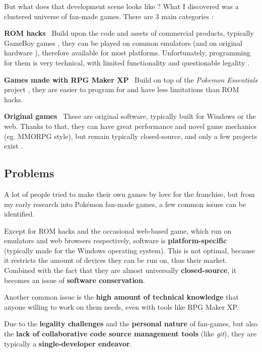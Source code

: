 \documentclass[11pt]{article}
\begin{document}
But what does that development scene looks like ? What I discovered was a clustered universe of fan-made games. There are 3 main categories : 

\textbf{ROM hacks} \ Build upon the code and assets of commercial products, typically GameBoy games \cite{PkmnFangames}, they can be played on common emulators (and on original hardware \cite{Homebrew}), therefore available for most platforms. Unfortunately, programming for them is very technical, with limited functionality and questionable legality \cite{PkmnRH}.

\textbf{Games made with RPG Maker XP} \ Build on top of the \textit{Pokemon Essentials} project \cite{PkmnFangames,Essentials}, they are easier to program for and have less limitations than ROM hacks.

\textbf{Original games} \  These are original software, typically built for Windows or the web. Thanks to that, they can have great performance and novel game mechanics (eg. MMORPG style), but remain typically closed-source, and only a few projects exist \cite{PkmnPlanet, PkmnLegends, PkmnFanGameList}.


\subsection{Problems}


A lot of people tried to make their own games by love for the franchise, but from my early research into Pokémon fan-made games, a few common issues can be identified.

Except for ROM hacks and the occasional web-based game, which run on emulators and web browsers respectively, software is \textbf{platform-specific} (typically made for the Windows operating system). This is not optimal, because it restricts the amount of devices they can be run on, thus their market. Combined with the fact that they are almost universally \textbf{closed-source}, it becomes an issue of \textbf{software conservation}.

Another common issue is the \textbf{high amount of technical knowledge} that anyone willing to work on them needs, even with tools like RPG Maker XP.

Due to the \textbf{legality challenges} and the \textbf{personal nature} of fan-games, but also the \textbf{lack of collaborative code source management tools} (like \textit{git}), they are typically a \textbf{single-developer endeavor}. 
\end{document}

